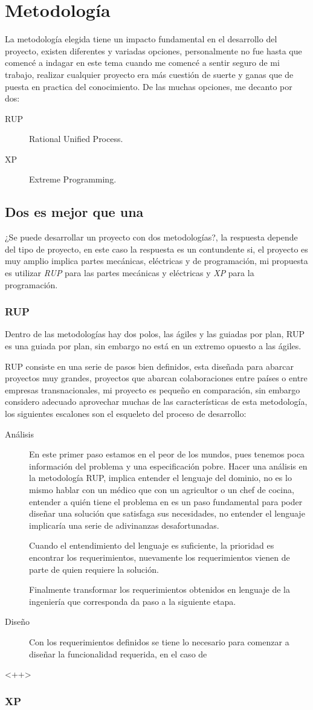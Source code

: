 \chapter{Metodología}
La metodología elegida tiene un impacto fundamental en el desarrollo del proyecto,
existen diferentes y variadas opciones, personalmente no fue hasta que comencé a 
indagar en este tema cuando me comencé a sentir seguro de mi trabajo, realizar 
cualquier proyecto era más cuestión de suerte y ganas que de puesta en 
practica del conocimiento. De las muchas opciones, me decanto por dos:
\begin{description}
	\item[RUP] Rational Unified Process.
	\item[XP] Extreme Programming.
\end{description}
\section{Dos es mejor que una}
¿Se puede desarrollar un proyecto con dos metodologías?, la respuesta depende del
tipo de proyecto, en este caso la respuesta es un contundente si, el proyecto es
muy amplio implica partes mecánicas, eléctricas y de programación, mi propuesta 
es utilizar \emph{RUP} para las partes mecánicas y eléctricas y \emph{XP} para 
la programación.
\subsection{RUP}
Dentro de las metodologías hay dos polos, las ágiles y las guiadas por plan, RUP
es una guiada por plan, sin embargo no está en un extremo opuesto a las ágiles.

RUP consiste en una serie de pasos bien definidos, esta diseñada para abarcar 
proyectos muy grandes, proyectos que abarcan colaboraciones entre países o entre
empresas transnacionales, mi proyecto es pequeño en comparación, sin embargo 
considero adecuado aprovechar muchas de las características de esta metodología,
los siguientes escalones son el esqueleto del proceso de desarrollo:
\begin{description}
	\item[Análisis] En este primer paso estamos en el peor de los mundos, pues
		tenemos poca información del problema y una especificación pobre.
		Hacer una análisis en la metodología RUP, implica entender el 
		lenguaje del dominio, no es lo mismo hablar con un médico que con
		un agricultor o un chef de cocina, entender a quién tiene el 
		problema en es un paso fundamental para poder diseñar
		una solución que satisfaga sus necesidades, no entender el 
		lenguaje implicaría una serie de adivinanzas desafortunadas.

		Cuando el entendimiento del lenguaje es suficiente, la prioridad
		es encontrar los requerimientos, nuevamente los requerimientos 
		vienen de parte de quien requiere la solución.

		Finalmente transformar los requerimientos obtenidos en lenguaje 
		de la ingeniería que corresponda da paso a la siguiente etapa.
	\item[Diseño] Con los requerimientos definidos se tiene lo necesario para
		comenzar a diseñar la funcionalidad requerida, en el caso de 
\end{description}<++>
\subsection{XP}
